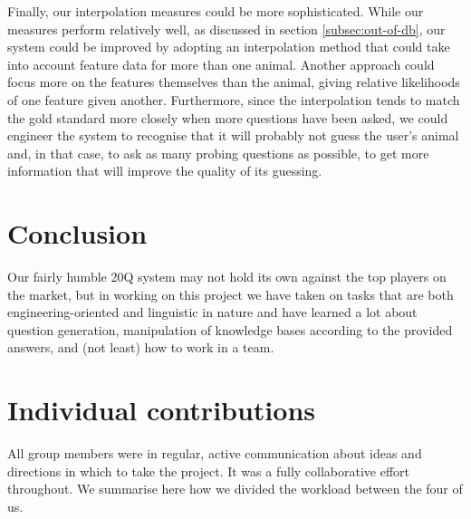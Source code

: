 \documentclass[11pt,a4paper]{article}
\begin{document}
Finally, our interpolation measures could be more sophisticated. While our measures perform relatively well, as discussed in section \ref{subsec:out-of-db}, our system could be improved by adopting an interpolation method that could take into account feature data for more than one animal. 
Another approach could focus more on the features themselves than the animal, giving relative likelihoods of one feature given another.
Furthermore, since the interpolation tends to match the gold standard more closely when more questions have been asked, we could engineer the system to recognise that it will probably not guess the user's animal and, in that case, to ask as many probing questions as possible, to get more information that will improve the quality of its guessing.


\section{Conclusion}
\label{sec:concl}

Our fairly humble 20Q system may not hold its own against the top players on the market, but in working on this project we have taken on tasks that are both engineering-oriented and linguistic in nature and have learned a lot about question generation, manipulation of knowledge bases according to the provided answers, and (not least) how to work in a team. 





\appendix

\section{Individual contributions}
\label{app:contributions}

All group members were in regular, active communication about ideas and directions in which to take the project.
It was a fully collaborative effort throughout.
We summarise here how we divided the workload between the four of us.
\end{document}
